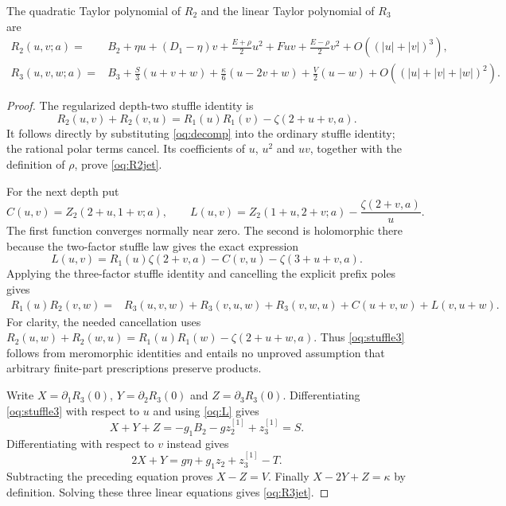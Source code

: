 \begin{theorem}\label{oq:jet}
The quadratic Taylor polynomial of $R_2$ and the linear Taylor polynomial
of $R_3$ are
\begin{align}\label{oq:R2jet}
 R_2(u,v;a)={}&B_2+\eta u+(D_1-\eta)v
 +\frac{E+\rho}{2}u^2+Fuv+\frac{E-\rho}{2}v^2
 +O((|u|+|v|)^3),\\
 R_3(u,v,w;a)={}&B_3+
 \frac S3(u+v+w)+\frac\kappa6(u-2v+w)
 +\frac V2(u-w)+O((|u|+|v|+|w|)^2).
 \label{oq:R3jet}
\end{align}
\end{theorem}
\begin{proof}
The regularized depth-two stuffle identity is
\begin{equation}\label{oq:stuffle2}
 R_2(u,v)+R_2(v,u)=R_1(u)R_1(v)-\zeta(2+u+v,a).
\end{equation}
It follows directly by substituting \eqref{oq:decomp} into the ordinary
stuffle identity; the rational polar terms cancel. Its coefficients of
$u$, $u^2$ and $uv$, together with the definition of $\rho$, prove
\eqref{oq:R2jet}.

For the next depth put
\[
 C(u,v)=Z_2(2+u,1+v;a),\qquad
 L(u,v)=Z_2(1+u,2+v;a)-\frac{\zeta(2+v,a)}u.
\]
The first function converges normally near zero. The second is holomorphic
there because the two-factor stuffle law gives the exact expression
\begin{equation}\label{oq:L}
 L(u,v)=R_1(u)\zeta(2+v,a)-C(v,u)-\zeta(3+u+v,a).
\end{equation}
Applying the three-factor stuffle identity and cancelling the explicit
prefix poles gives
\begin{align}\label{oq:stuffle3}
 R_1(u)R_2(v,w)={}&R_3(u,v,w)+R_3(v,u,w)+R_3(v,w,u)
 +C(u+v,w)+L(v,u+w).
\end{align}
For clarity, the needed cancellation uses
$R_2(u,w)+R_2(w,u)=R_1(u)R_1(w)-\zeta(2+u+w,a)$.
Thus \eqref{oq:stuffle3} follows from meromorphic identities and entails
no unproved assumption that arbitrary finite-part prescriptions preserve
products.

Write $X=\partial_1R_3(0)$, $Y=\partial_2R_3(0)$ and
$Z=\partial_3R_3(0)$. Differentiating \eqref{oq:stuffle3} with respect
to $u$ and using \eqref{oq:L} gives
\[
 X+Y+Z=-g_1B_2-gz_2^{[1]}+z_3^{[1]}=S.
\]
Differentiating with respect to $v$ instead gives
\[
 2X+Y=g\eta+g_1z_2+z_3^{[1]}-T.
\]
Subtracting the preceding equation proves $X-Z=V$.
Finally $X-2Y+Z=\kappa$ by definition. Solving these three linear
equations gives \eqref{oq:R3jet}.
\end{proof}

